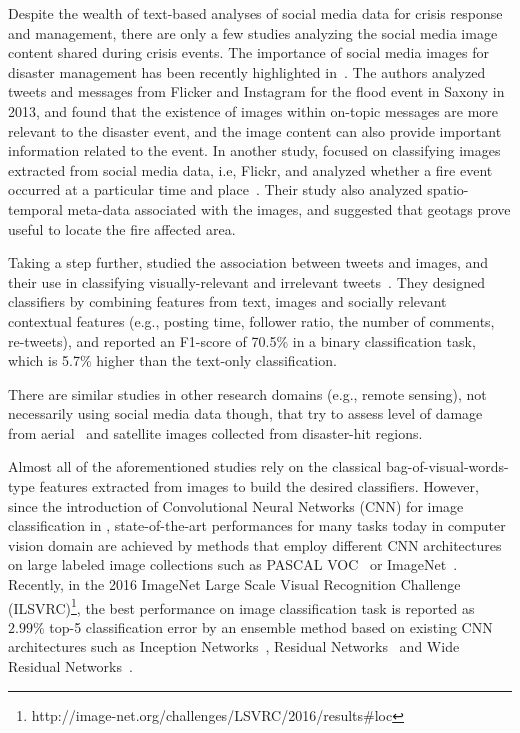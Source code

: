 \documentclass{iscram}
\begin{document}
Despite the wealth of text-based analyses of social media data for crisis response and management, there are only a few studies analyzing the social media image content shared during crisis events.
The importance of social media images for disaster management has been recently highlighted in~\parencite{petersinvestigating}.
The authors analyzed tweets and messages from Flicker and Instagram for the flood event in Saxony in 2013, and found that the existence of images within on-topic messages are more relevant to the disaster event, and the image content can also provide important information related to the event.
In another study, \citeauthor{daly2016mining} focused on classifying images extracted from social media data, i.e, Flickr, and analyzed whether a fire event occurred at a particular time and place~\parencite{daly2016mining}. Their study also analyzed spatio-temporal meta-data associated with the images, and suggested that geotags prove useful to locate the fire affected area.

Taking a step further, \citeauthor{chen2013understanding} studied the association between tweets and images, and their use in classifying visually-relevant and irrelevant tweets~\parencite{chen2013understanding}. They designed classifiers by combining features from text, images and socially relevant contextual features (e.g., posting time, follower ratio, the number of comments, re-tweets), and reported an F1-score of 70.5\% in a binary classification task, which is 5.7\% higher than the text-only classification.

There are similar studies in other research domains (e.g., remote sensing), not necessarily using social media data though, that try to assess level of damage from aerial~\parencite{TurkerM:IJRS04,FernandezGalarreta:2015dn} and satellite \parencite{pesaresi2007rapid,feng2014application} images collected from disaster-hit regions. 


Almost all of the aforementioned studies rely on the classical bag-of-visual-words-type features extracted from images to build the desired classifiers. However, since the introduction of Convolutional Neural Networks (CNN) for image classification in \parencite{NIPS2012_4824}, state-of-the-art performances for many tasks today in computer vision domain are achieved by methods that employ different CNN architectures on large labeled image collections such as PASCAL VOC~\parencite{Everingham10} or ImageNet~\parencite{ILSVRC15}. Recently, in the 2016 ImageNet Large Scale Visual Recognition Challenge (ILSVRC)\footnote{http://image-net.org/challenges/LSVRC/2016/results\#loc}, the best performance on image classification task is reported as $2.99\%$ top-5 classification error by an ensemble method based on existing CNN architectures such as Inception Networks~\parencite{SzegedyVISW15}, Residual Networks~\parencite{He_2016_CVPR} and Wide Residual Networks~\parencite{ZagoruykoK16}.
\end{document}
